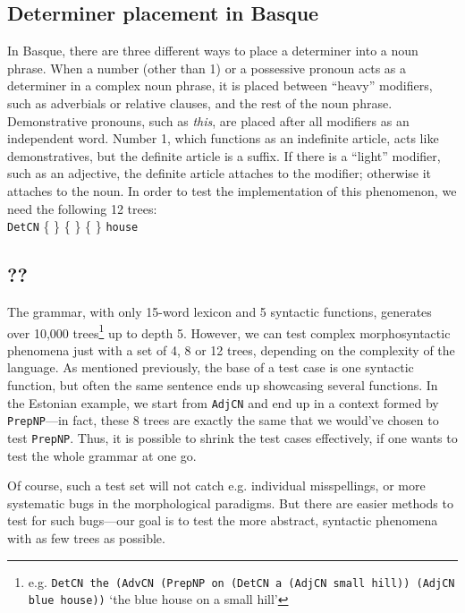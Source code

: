 \documentclass[11pt]{article}
\def\t#1{\texttt{#1}}
\newcommand{\tts}[1]{{\tt #1}}
\begin{document}
\subsection{Determiner placement in Basque} In Basque, there are three
different ways to place a determiner into a noun phrase. When a number
(other than 1) or a possessive pronoun acts as a determiner in a
complex noun phrase, it is placed between ``heavy'' modifiers, such as
adverbials or relative clauses, and the rest of the noun
phrase. Demonstrative pronouns, such as \emph{this}, are placed after
all modifiers as an independent word. Number 1, which functions as an
indefinite article, acts like demonstratives, but the definite article
is a suffix. If there is a ``light'' modifier, such as an adjective,
the definite article attaches to the modifier; otherwise it attaches
to the noun. In order to test the implementation of this phenomenon,
we need the following 12 trees:  \\ 
\t{DetCN} \{
\stackanchor{\stackanchor{}{\tts{the}}}{\stackanchor{\tts{this}}{\tts{your}}}
\} \{  \} 
\{  \}  {\tt house} 

\subsection{??}

The grammar, with only 15-word lexicon and 5 syntactic functions,
generates over 10,000 %
trees\footnote{e.g. {\tt DetCN the (AdvCN (PrepNP on
(DetCN a (AdjCN small hill)) (AdjCN blue house))} `the blue house on a
small hill'}  up to depth 5. 
However, we can test complex morphosyntactic phenomena just with a set
of 4, 8 or 12 trees, depending on the complexity of the language. As
mentioned previously, the base of a test case is one syntactic
function, but often the same sentence ends up showcasing several
functions. In the Estonian example, we start from \t{AdjCN} 
and end up in a context formed by \t{PrepNP}---in fact, these 8 trees
are exactly the same that we would've chosen to test \t{PrepNP}. Thus,
it is possible to shrink the test cases effectively, if one wants to
test the whole grammar at one go.

Of course, such a test set will not catch e.g. individual
misspellings, or more systematic bugs in the morphological
paradigms. But there are easier methods to test for such bugs---our 
goal is to test the more abstract, syntactic phenomena with as few
trees as possible.  
\end{document}

